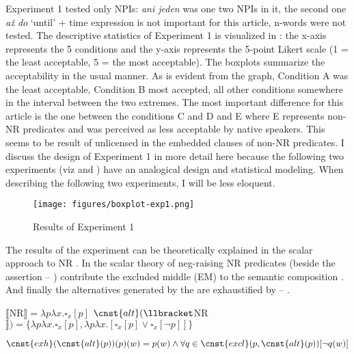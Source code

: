\documentclass[output=paper, colorlinks, citecolor=brown, newtxmath]{langsci/langscibook}
\begin{document}
\noindent Experiment 1 tested only NPIs: \textit{ani jeden} was one two NPIs in it, the second one \textit{až do} `until' + time expression is not important for this article, n-words were not tested. The descriptive statistics of Experiment 1 is visualized in : the x-axis represents the 5 conditions and the y-axis represents the 5-point Likert scale (1 = the least acceptable, 5 = the most acceptable). The boxplots summarize the acceptability in the usual manner. As is evident from the graph, Condition A was the least acceptable, Condition B most accepted, all other conditions somewhere in the interval between the two extremes. The most important difference for this article is the one between the conditions C and D and E where E represents non-NR predicates and was perceived as less acceptable by native speakers. This seems to be result of unlicensed  in the embedded clauses of non-NR predicates. I discuss the design of Experiment 1 in more detail here because the following two experiments (viz  and ) have an analogical design and statistical modeling. When describing the following two experiments, I will be less eloquent.

\begin{figure}
\centering
\texttt{[image: figures/boxplot-exp1.png]}
\caption{Results of Experiment 1}
\label{fig1_stat}
\end{figure}


The results of the experiment can be theoretically explained in the scalar approach to NR \citep{horn1973semantic,romoli2012soft,romoli2013scalar}. In the scalar theory of neg-raising  NR predicates (beside the assertion -- ) contribute the  excluded middle (EM)  to the semantic composition . And finally the   alternatives generated by the  are exhaustified by  -- .

\ea \ea \label{ex-25-a} $\llbracket$NR$\rrbracket = \lambda p\lambda x.\square_x[p]$
\ex \label{ex-25-b} $\cnst{alt}(\llbracket$NR$\rrbracket)=\{\lambda p\lambda x.\square_x[p],\lambda p\lambda x.[\square_x[p] \vee \square_x[\neg p]]\}$
\z
\z

\ea \label{ex-26} $\cnst{exh}(\cnst{alt}(p))(p)(w) = p(w) \wedge \forall q \in \cnst{excl}(p,\cnst{alt}(p))[\neg q(w)]$
\z
\end{document}
